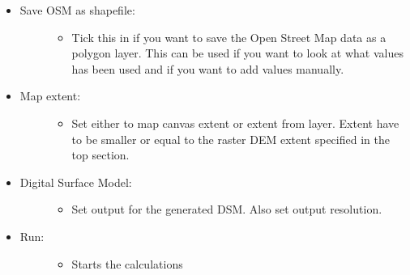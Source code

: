 \documentclass[letterpaper,10pt,english]{sphinxmanual}
\begin{document}
\begin{itemize}
\begin{description}
\end{description}

\item {} \begin{description}
\item[{Save OSM as shapefile:}] \leavevmode\begin{itemize}
\item {} 
Tick this in if you want to save the Open Street Map data as a polygon layer. This can be used if you want to look at what values has been used and if you want to add values manually.

\end{itemize}

\end{description}

\item {} \begin{description}
\item[{Map extent:}] \leavevmode\begin{itemize}
\item {} 
Set either to map canvas extent or extent from layer. Extent have to be smaller or equal to the raster DEM extent specified in the top section.

\end{itemize}

\end{description}

\item {} \begin{description}
\item[{Digital Surface Model:}] \leavevmode\begin{itemize}
\item {} 
Set output for the generated DSM. Also set output resolution.

\end{itemize}

\end{description}

\item {} \begin{description}
\item[{Run:}] \leavevmode\begin{itemize}
\item {} 
Starts the calculations

\end{itemize}

\end{description}


\end{itemize}
\end{document}
